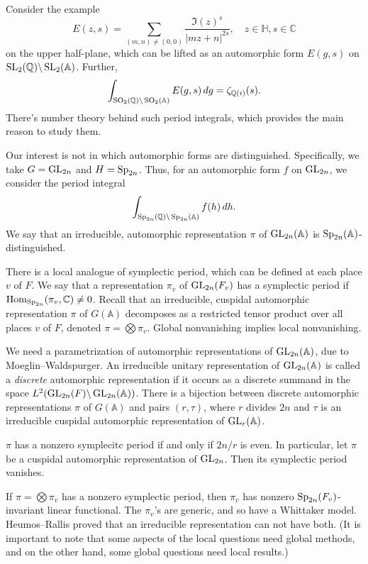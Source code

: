 \documentclass[reqno]{amsart} 
\begin{document}
Consider the example
\begin{equation*}
  E(z, s) = \sum_{(m, n) \neq(0, 0)}
  \frac{\Im(z)^s}{ \lvert m z + n \rvert^{2 s}}, \quad z \in \mathbb{H}, s \in \mathbb{C}
\end{equation*}
on the upper half-plane, which can be lifted as an automorphic form $E(g, s)$ on $\operatorname{SL}_2(\mathbb{Q}) \backslash \operatorname{SL}_2(\mathbb{A})$.  Further,
\begin{equation*}
  \int_{\operatorname{SO}_2(\mathbb{Q}) \backslash \operatorname{SO}_2(\mathbb{A})} E(g, s) \, d g = \zeta_{\mathbb{Q}(i)}(s).
\end{equation*}
There's number theory behind such period integrals, which provides the main reason to study them.

Our interest is not in which automorphic forms are distinguished.  Specifically, we take $G = \operatorname{GL}_{2n}$ and $H = \operatorname{Sp}_{2n}$.  Thus, for an automorphic form $f$ on $\operatorname{GL}_{2n}$, we consider the period integral
\begin{equation*}
  \int_{\operatorname{Sp}_{2 n}(\mathbb{Q}) \backslash \operatorname{Sp}_{2 n}(\mathbb{A})}
  f(h) \, d h.
\end{equation*}
We say that an irreducible, automorphic representation $\pi$ of $\operatorname{GL}_{2 n}(\mathbb{A})$ is $\operatorname{Sp}_{2 n}(\mathbb{A})$-distinguished.

There is a local analogue of symplectic period, which can be defined at each place $v$ of $F$.  We say that a representation $\pi_v$ of $\operatorname{GL}_{2 n}(F_v)$ has a symplectic period if $\operatorname{Hom}_{\operatorname{Sp}_{2 n}}(\pi_v, \mathbb{C}) \neq 0$.  Recall that an irreducible, cuspidal automorphic representation $\pi$ of $G(\mathbb{A})$ decomposes as a restricted tensor product over all places $v$ of $F$, denoted $\pi = \bigotimes \pi_v$.  Global nonvanishing implies local nonvanishing.

We need a parametrization of automorphic representations of $\operatorname{GL}_{2 n}(\mathbb{A})$, due to Moeglin--Waldspurger.  An irreducible unitary representation of $\operatorname{GL}_{2 n}(\mathbb{A})$ is called a \emph{discrete} automorphic representation if it occurs as a discrete summand in the space $L^2(\operatorname{GL}_{2 n}(F) \backslash \operatorname{GL}_{2 n}(\mathbb{A}))$.  There is a bijection between discrete automorphic representations $\pi$ of $G(\mathbb{A})$ and pairs $(r, \tau)$, where $r$ divides $2 n$ and $\tau$ is an irreducible cuspidal automorphic representation of $\operatorname{GL}_r(\mathbb{A})$.

\begin{theorem}
  $\pi$ has a nonzero symplecitc period if and only if $2 n / r$ is even.  In particular, let $\pi$ be a cuspidal automorphic representation of $\operatorname{GL}_{2 n}$.  Then its symplectic period vanishes.
\end{theorem}
If $\pi = \bigotimes \pi_v$ has a nonzero symplectic period, then $\pi_v$ has  nonzero $\operatorname{Sp}_{2 n}(F_v)$-invariant linear functional.  The $\pi_v$'s are generic, and so have a Whittaker model.  Heumos--Rallis proved that an irreducible representation can not have both.  (It is important to note that some aspects of the local questions need global methods, and on the other hand, some global questions need local results.)
\end{document}

